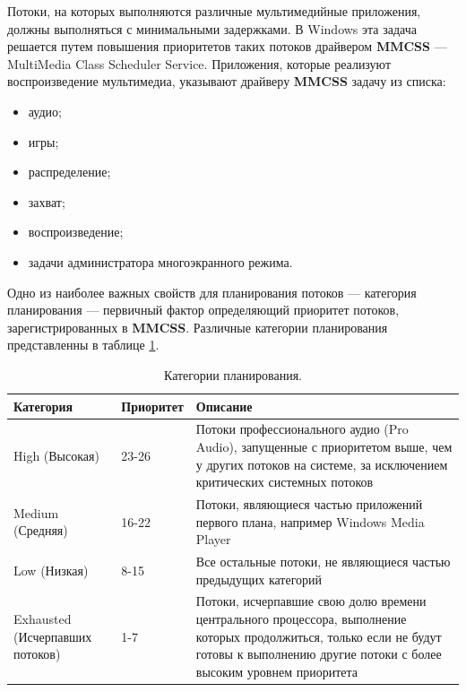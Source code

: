 \documentclass[a4paper,14pt]{extarticle}
\begin{document}
Потоки, на которых выполняются различные мультимедийные приложения, должны выполняться с минимальными задержками. В Windows эта задача решается путем повышения приоритетов таких потоков драйвером \textbf{MMCSS} --- MultiMedia Class Scheduler Service. Приложения, которые реализуют воспроизведение мультимедиа, указывают драйверу \textbf{MMCSS} задачу из списка:

\begin{itemize}
	\item аудио;
	\item игры;
	\item распределение;
	\item захват;
	\item воспроизведение;
	\item задачи администратора многоэкранного режима.
\end{itemize}

Одно из наиболее важных свойств для планирования потоков --- категория планирования --- первичный фактор определяющий приоритет потоков, зарегистрированных в \textbf{MMCSS}. Различные категории планирования представленны в таблице \ref{tab:plan}.

\begin{table}[h]
	\caption{Категории планирования.}
	\begin{center}
		\begin{tabular}{|p{42mm}|p{28mm}|p{83mm}|}
			\hline
			\textbf{Категория} & \textbf{Приоритет} & \textbf{Описание} \\
			\hline
			High (Высокая) & 23-26 & Потоки профессионального аудио (Pro Audio), запущенные с приоритетом выше, чем у других потоков на системе, за исключением критических системных потоков \\
			\hline
			Medium (Средняя) & 16-22 & Потоки, являющиеся частью приложений первого плана, например Windows Media Player \\
			\hline
			Low (Низкая) & 8-15 & Все остальные потоки, не являющиеся частью предыдущих категорий \\
			\hline
			Exhausted (Исчерпавших потоков) & 1-7 & Потоки, исчерпавшие свою долю времени центрального процессора, выполнение которых продолжиться, только если не будут готовы к выполнению другие потоки с более высоким уровнем приоритета \\
			\hline
		\end{tabular}
	\end{center}
	\label{tab:plan}
\end{table}
\end{document}
